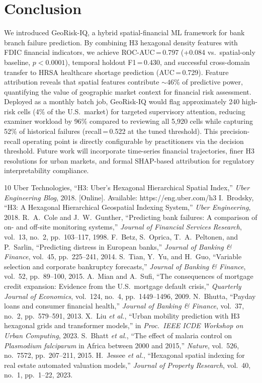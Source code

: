 \documentclass[conference]{IEEEtran}
\begin{document}
\section{Conclusion}
We introduced GeoRisk-IQ, a hybrid spatial-financial ML framework for
bank branch failure prediction. By combining H3 hexagonal density features
with FDIC financial indicators, we achieve ROC-AUC\,=\,0.797
(+0.084 vs.\ spatial-only baseline, $p < 0.0001$), temporal holdout
F1\,=\,0.430, and successful cross-domain transfer to HRSA healthcare
shortage prediction (AUC\,=\,0.729). Feature attribution reveals that
spatial features contribute ${{\sim}}46$\% of predictive power,
quantifying the value of geographic market context for financial risk
assessment.
Deployed as a monthly batch job, GeoRisk-IQ would flag approximately
240 high-risk cells (4\% of the U.S.\ market) for targeted supervisory
attention, reducing examiner workload by 96\% compared to reviewing all
5,920 cells while capturing 52\% of historical failures (recall\,=\,0.522
at the tuned threshold). This precision-recall operating point is directly
configurable by practitioners via the decision threshold.
Future work will incorporate time-series financial trajectories, finer
H3 resolutions for urban markets, and formal SHAP-based attribution for
regulatory interpretability compliance.
\begin{thebibliography}{10}
Uber Technologies, ``H3: Uber's Hexagonal Hierarchical Spatial Index,''
\textit{Uber Engineering Blog}, 2018.
[Online]. Available: https://eng.uber.com/h3
I.~Brodsky, ``H3: A Hexagonal Hierarchical Geospatial Indexing System,''
\textit{Uber Engineering}, 2018.
R.~A.~Cole and J.~W.~Gunther, ``Predicting bank failures: A comparison
of on- and off-site monitoring systems,'' \textit{Journal of Financial
Services Research}, vol.~13, no.~2, pp.~103–117, 1998.
F.~Betz, S.~Oprica, T.~A.~Peltonen, and P.~Sarlin, ``Predicting distress
in European banks,'' \textit{Journal of Banking \& Finance}, vol.~45,
pp.~225–241, 2014.
S.~Tian, Y.~Yu, and H.~Guo, ``Variable selection and corporate bankruptcy
forecasts,'' \textit{Journal of Banking \& Finance}, vol.~52,
pp.~89–100, 2015.
A.~Mian and A.~Sufi, ``The consequences of mortgage credit expansion:
Evidence from the U.S.\ mortgage default crisis,'' \textit{Quarterly
Journal of Economics}, vol.~124, no.~4, pp.~1449–1496, 2009.
N.~Bhutta, ``Payday loans and consumer financial health,''
\textit{Journal of Banking \& Finance}, vol.~37, no.~2,
pp.~579–591, 2013.
X.~Liu \textit{et al.}, ``Urban mobility prediction with H3 hexagonal
grids and transformer models,'' in \textit{Proc.\ IEEE ICDE Workshop on
Urban Computing}, 2023.
S.~Bhatt \textit{et al.}, ``The effect of malaria control on
\textit{Plasmodium falciparum} in Africa between 2000 and 2015,''
\textit{Nature}, vol.~526, no.~7572, pp.~207–211, 2015.
H.~Jessee \textit{et al.}, ``Hexagonal spatial indexing for real estate
automated valuation models,'' \textit{Journal of Property Research},
vol.~40, no.~1, pp.~1–22, 2023.
\end{thebibliography}
\appendix
\end{document}

